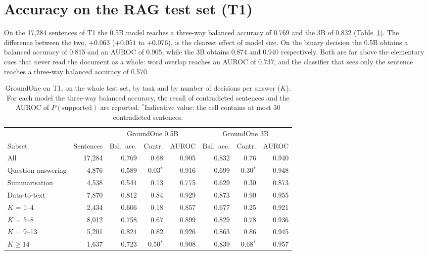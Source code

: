 \section{Accuracy on the RAG test set (T1)}
\label{sec:results-t1}

On the 17{,}284 sentences of T1 the 0.5B model reaches a three-way balanced accuracy of 0.769 and the 3B of 0.832
(Table~\ref{tab:results-t1}). The difference between the two, $+0.063$ ($+0.051$ to $+0.076$), is the clearest effect of
model size. On the binary decision the 0.5B obtains a balanced accuracy of 0.815 and an AUROC of 0.905, while the 3B
obtains 0.874 and 0.940 respectively. Both are far above the elementary cues that never read the document as a whole: word
overlap reaches an AUROC of 0.737, and the classifier that sees only the sentence reaches a three-way balanced accuracy
of 0.570.

\begin{table}[htbp]
\centering
\caption{GroundOne on T1, on the whole test set, by task and by number of decisions per answer ($K$). For each model the
three-way balanced accuracy, the recall of contradicted sentences and the AUROC of $P(\text{supported})$ are reported.
$^{*}$Indicative value: the cell contains at most 30 contradicted sentences.}
\label{tab:results-t1}
\small
\begin{adjustbox}{max width=\textwidth}
\begin{tabular}{@{}lrrrrrrr@{}}
\toprule
 & & \multicolumn{3}{c}{GroundOne 0.5B} & \multicolumn{3}{c}{GroundOne 3B} \\
\cmidrule(lr){3-5}\cmidrule(l){6-8}
Subset & Sentences & Bal.\ acc. & Contr. & AUROC & Bal.\ acc. & Contr. & AUROC \\
\midrule
All & 17{,}284 & 0.769 & 0.68 & 0.905 & 0.832 & 0.76 & 0.940 \\
\midrule
Question answering & 4{,}876 & 0.589 & 0.03$^{*}$ & 0.916 & 0.699 & 0.30$^{*}$ & 0.948 \\
Summarisation & 4{,}538 & 0.544 & 0.13 & 0.775 & 0.629 & 0.30 & 0.873 \\
Data-to-text & 7{,}870 & 0.812 & 0.84 & 0.929 & 0.873 & 0.90 & 0.955 \\
\midrule
$K$ = 1--4 & 2{,}434 & 0.606 & 0.18 & 0.857 & 0.677 & 0.25 & 0.921 \\
$K$ = 5--8 & 8{,}012 & 0.758 & 0.67 & 0.899 & 0.829 & 0.78 & 0.936 \\
$K$ = 9--13 & 5{,}201 & 0.824 & 0.82 & 0.926 & 0.863 & 0.86 & 0.945 \\
$K \geq 14$ & 1{,}637 & 0.723 & 0.50$^{*}$ & 0.908 & 0.839 & 0.68$^{*}$ & 0.957 \\
\bottomrule
\end{tabular}
\end{adjustbox}
\end{table}

